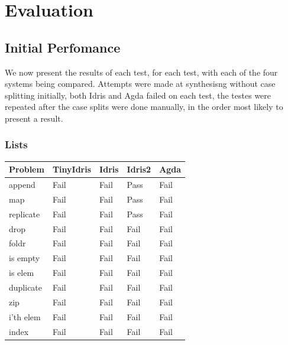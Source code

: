 \documentclass[a4paper]{article}
\begin{document}
\section{Evaluation}
\label{sec:orge3897b5}
\subsection{Initial Perfomance}
\label{sec:orgfea0890}

We now present the results of each test, for each test,
with each of the four systems being compared. Attempts
were made at synthesisng without case splitting initially, 
both Idris and Agda failed on each test, the testes were
repeated after the case splits were done manually, in the 
order most likely to present a result. 

\subsubsection{Lists}
\label{sec:org9a1993c}
\begin{center}
\begin{tabular}{lllll}
Problem & TinyIdris & Idris & Idris2 & Agda\\
\hline
append & Fail & Fail & Pass & Fail\\
map & Fail & Fail & Pass & Fail\\
replicate & Fail & Fail & Pass & Fail\\
drop & Fail & Fail & Fail & Fail\\
foldr & Fail & Fail & Fail & Fail\\
is empty & Fail & Fail & Fail & Fail\\
is elem & Fail & Fail & Fail & Fail\\
duplicate & Fail & Fail & Fail & Fail\\
zip & Fail & Fail & Fail & Fail\\
i'th elem & Fail & Fail & Fail & Fail\\
index & Fail & Fail & Fail & Fail\\
\end{tabular}
\end{center}
\end{document}
